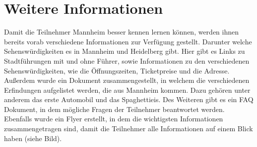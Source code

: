 \section{Weitere Informationen}
Damit die Teilnehmer Mannheim besser kennen lernen können, werden ihnen bereits vorab verschiedene Informationen zur Verfügung gestellt. Darunter welche Sehenswürdigkeiten es in Mannheim und Heidelberg gibt. Hier gibt es Links zu Stadtführungen mit und ohne Führer, sowie Informationen zu den verschiedenen Sehenswürdigkeiten, wie die Öffnungszeiten, Ticketpreise und die Adresse. Außerdem wurde ein Dokument zusammengestellt, in welchem die verschiedenen Erfindungen aufgelistet werden, die aus Mannheim kommen. Dazu gehören unter anderem das erste Automobil und das Spaghettieis. Des Weiteren gibt es ein FAQ Dokument, in dem mögliche Fragen der Teilnehmer beantwortet werden. Ebenfalls wurde ein Flyer erstellt, in dem die wichtigsten Informationen zusammengetragen sind, damit die Teilnehmer alle Informationen auf einem Blick haben (siehe Bild).

